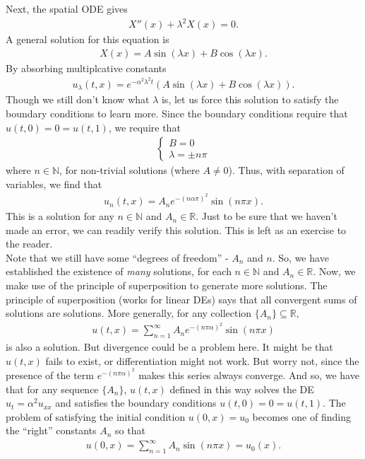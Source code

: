 \documentclass{book}
\theoremstyle{definition}
\newcommand{\R}{\mathbb{R}}
\begin{document}
Next, the spatial ODE gives
\begin{align*}
X''(x) + \lambda^2 X(x) = 0.
\end{align*}
A general solution for this equation is
\begin{align*}
X(x) = A\sin(\lambda x) + B\cos(\lambda x).
\end{align*}
By absorbing multiplcative constants
\begin{align*}
u_\lambda(t,x) = e^{-\alpha^2\lambda^2 t}\left(A\sin(\lambda x) + B\cos(\lambda x) \right).
\end{align*}
Though we still don't know what $\lambda$ is, let us force this solution to satisfy the boundary conditions to learn more. Since the boundary conditions require that $u(t,0)=0=u(t,1)$, we require that
\begin{align*}
\begin{cases}
B=0\\
\lambda = \pm n\pi
\end{cases}
\end{align*}
where $n\in \mathbb{N}$, for non-trivial solutions (where $A\neq 0$). Thus, with separation of variables, we find that
\begin{align*}
u_n(t,x) = A_ne^{-(n\alpha\pi)^2}\sin(n\pi x).
\end{align*}
This is a solution for any $n\in \mathbb{N}$ and $A_n\in\R$. Just to be sure that we haven't made an error, we can readily verify this solution. This is left as an exercise to the reader. \\

Note that we still have some ``degrees of freedom'' - $A_n$ and $n$. So, we have established the existence of \textit{many} solutions, for each $n\in\mathbb{N}$ and $A_n\in\R$. Now, we make use of the principle of superposition to generate more solutions. The principle of superposition (works for linear DEs) says that all convergent sums of solutions are solutions. More generally, for any collection $\{A_n \} \subseteq\R$,
\begin{align*}
u(t,x) = \sum_{n=1}^\infty A_n e^{-(n\pi\alpha)^2}\sin(n\pi x)
\end{align*}
is also a solution. But divergence could be a problem here. It might be that $u(t,x)$ fails to exist, or differentiation might not work. But worry not, since the presence of the term $e^{-(n\pi\alpha)^2}$ makes this series always converge. And so, we have that for any sequence $\{ A_n\}$, $u(t,x)$ defined in this way solves the DE $u_t = \alpha^2 u_{xx}$ and satisfies the boundary conditions $u(t,0)=0=u(t,1)$. The problem of satisfying the initial condition $u(0,x) = u_0$ becomes one of finding the ``right'' constants $A_n$ so that 
\begin{align*}
u(0,x) = \sum_{n=1}^\infty A_n\sin(n\pi x) = u_0(x).
\end{align*} 
\end{document}
